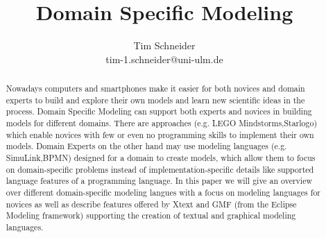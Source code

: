 \documentclass[runningheads,a4paper]{llncs}
\begin{document}
\mainmatter  %

\title{Domain Specific Modeling}



\author{Tim Schneider\\ tim-1.schneider@uni-ulm.de}


\maketitle


\begin{abstract}
Nowadays computers and smartphones make it easier for both novices and domain experts to build 
and explore their own models and learn new scientific ideas in the process.
Domain Specific Modeling can support both experts and novices in building models for different domains.
There are approaches (e.g. LEGO Mindstorms,Starlogo) which enable novices with few or even no programming 
skills to implement their own models.
Domain Experts on the other hand may use modeling languages (e.g. SimuLink,BPMN) designed for a domain to create models, 
which allow them to focus on domain-specific problems instead of implementation-specific details like supported 
language features of a programming language.
In this paper we will give an overview over different domain-specific modeling langues with a focus on modeling languages for novices
as well as describe features offered by Xtext and GMF (from the Eclipse Modeling framework) supporting the creation of textual and graphical modeling languages.
\end{abstract}
\end{document}
